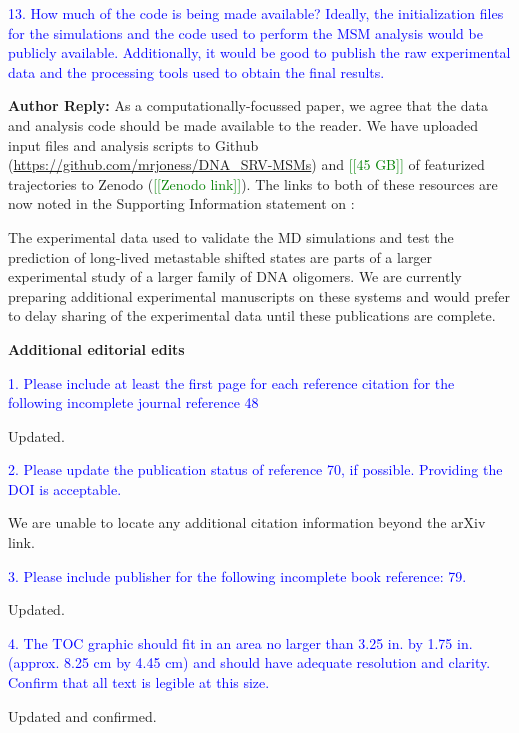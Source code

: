 \documentclass[11pt,a4paper]{letter} %
\newcommand*{\rood}[1]{{\color{red}{#1}}}
\newcommand*{\noteg}[1]{\textcolor{green}{[[#1]]}}		%
\newcommand*{\noter}[1]{{\color{red}{[[#1]]}}}
\begin{document}
\textcolor{blue}{13. How much of the code is being made available? Ideally, the initialization files for the simulations and the code used to perform the MSM analysis would be publicly available. Additionally, it would be good to publish the raw experimental data and the processing tools used to obtain the final results.}

\textbf{Author Reply:}   As a computationally-focussed paper, we agree that the data and analysis code should be made available to the reader. We have uploaded input files and analysis scripts to Github (\url{https://github.com/mrjoness/DNA_SRV-MSMs}) and \noteg{45 GB} of featurized trajectories to Zenodo (\noteg{Zenodo link}). The links to both of these resources are now noted in the Supporting Information statement on \rood{p.~36}:

\noter{Insert new text added to this section here.}

\noter{We need to add one more sentence on why we will not upload the experimental data. How about this? Check with Brennan and Andrei.} The experimental data used to validate the MD simulations and test the prediction of long-lived metastable shifted states are parts of a larger experimental study of a larger family of DNA oligomers. We are currently preparing additional experimental manuscripts on these systems and would prefer to delay sharing of the experimental data until these publications are complete.









\clearpage
\newpage

\begin{shaded}
\textbf{Additional editorial edits}
\end{shaded}

\textcolor{blue}{1. Please include at least the first page for each reference citation for the following incomplete journal reference 48}

Updated.

\textcolor{blue}{2. Please update the publication status of reference 70, if possible.  Providing the DOI is acceptable.}

We are unable to locate any additional citation information beyond the arXiv link.

\textcolor{blue}{3. Please include publisher for the following incomplete book reference: 79.}

Updated.

\textcolor{blue}{4. The TOC graphic should fit in an area no larger than 3.25 in. by 1.75 in. (approx. 8.25 cm by 4.45  cm) and should have adequate resolution and clarity. Confirm that all text is legible at this size.}

Updated and confirmed. \noter{Either version is fine, please confirm it fits in the 3.25 by 1.75 in specification and text is legible.}

\clearpage
\newpage



\end{document}
